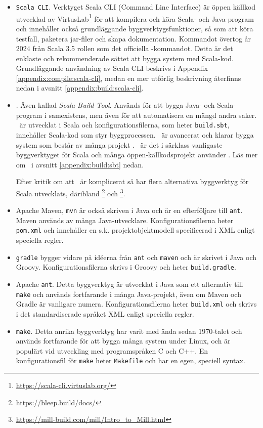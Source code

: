 \begin{itemize}

\item \texttt{Scala CLI}. Verktyget Scala CLI (Command Line Interface) är öppen källkod utvecklad av VirtusLab\footnote{\url{https://scala-cli.virtuslab.org/}} för att kompilera och köra Scala- och Java-program och innehåller också grundläggande byggverktygsfunktioner, så som att köra testfall, paketera jar-filer och skapa dokumentation. Kommandot  övertog år 2024 från Scala 3.5 rollen som det officiella -kommandot. Detta är det enklaste och rekommenderade sättet att bygga system med Scala-kod. Grundläggande användning av Scala CLI beskrivs i Appendix \ref{appendix:compile:scala-cli}, medan en mer utförlig beskrivning återfinns nedan i avsnitt \ref{appendix:build:scala-cli}.

\item \sbt. Även kallad \textit{Scala Build Tool}. Används för att bygga Java- och Scala-program i samexistens, men även för att automatisera en mängd andra saker. \sbt~är utvecklat i Scala och konfigurationsfilerna, som heter \texttt{build.sbt}, innehåller Scala-kod som styr byggprocessen. \sbt~är avancerat och klarar bygga system som består av många projekt . \sbt~är det i särklass vanligaste byggverktyget för Scala och många öppen-källkodsprojekt använder \sbt. Läs mer om \sbt~i avsnitt \ref{appendix:build:sbt} nedan.

Efter kritik om att \sbt~är komplicerat så har flera alternativa byggverktyg för Scala utvecklats, däribland \footnote{\url{https://bleep.build/docs/}} och \footnote{\url{https://mill-build.com/mill/Intro_to_Mill.html}}. 


\item Apache Maven, \texttt{mvn} är också skriven i Java och är en efterföljare till \texttt{ant}. Maven används av många Java-utvecklare. Konfigurationsfilerna heter \texttt{pom.xml} och innehåller en s.k. projektobjektmodell specificerad i XML enligt  speciella regler.

\item \texttt{gradle} bygger vidare på idéerna från \texttt{ant} och \texttt{maven} och är skrivet i Java och Groovy.  Konfigurationsfilerna skrivs i Groovy och heter \texttt{build.gradle}.

\item Apache \texttt{ant}. Detta byggverktyg är utvecklat i Java som ett alternativ till \texttt{make} och används fortfarande i många Java-projekt, även om Maven och Gradle är vanligare numera. Konfigurationsfilerna heter \texttt{build.xml} och skrivs i det standardiserade språket XML enligt  speciella regler.

\item \texttt{make}. Detta anrika byggverktyg har varit med ända sedan 1970-talet och används fortfarande för att bygga många system under Linux, och är populärt vid utveckling med programspråken C och C++. En konfigurationsfil för \texttt{make} heter \texttt{Makefile} och har en egen, speciell syntax.
\end{itemize}


